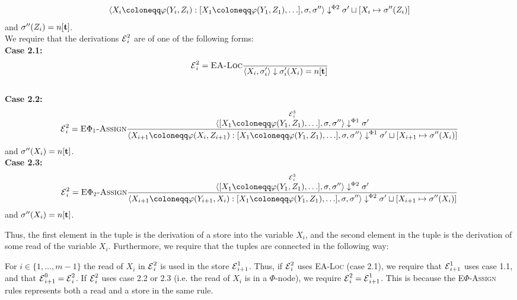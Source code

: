 \begin{definition}
\begin{align*}
        {\bigsteppr{\phistore{X_i}{Y_i}{Z_i} : \defaultphilist}{\store}{\store''}{\storeassign{\store'}{X_i \mapsto \store''(Z_i)}}}\\
    \end{align*} and $\store''(Z_i) = \tracked{}$.\\
    We require that the derivations $\operatorname{\mathcal{E}}^2_i$ are of one of the following forms:\\
    \textbf{Case 2.1:}\\
    \begin{align*}
        \E^2_i=\bsrule{EA-Loc}{}
        {\bigstep{X_i}{\store_i'}{\store_i'(X_i) = \tracked{}}}
    \end{align*}\\
    \textbf{Case 2.2:}\\
    \begin{align*}
        \E^2_i=\bsrule{E$\Phi_1$-Assign}
        {\overset{\E^3_i}{\bigsteppl{\defaultphilist}{\store}{\store''}{\store'}}}
        {\bigsteppl{\phistore{X_{i+1}}{X_i}{Z_{i+1}} : \defaultphilist}{\store}{\store''}{\storeassign{\store'}{X_{i+1} \mapsto \store''(X_i)}}}\\
    \end{align*} and $\store''(X_i) = \tracked{}$.\\
    \textbf{Case 2.3:}\\
    \begin{align*}
        \E^2_i=\bsrule{E$\Phi_2$-Assign}
        {\overset{\E^3_i}{\bigsteppr{\defaultphilist}{\store}{\store''}{\store'}}}
        {\bigsteppr{\phistore{X_{i+1}}{Y_{i+1}}{X_i} : \defaultphilist}{\store}{\store''}{\storeassign{\store'}{X_{i+1} \mapsto \store''(X_i)}}}\\
    \end{align*} and $\store''(X_i) = \tracked{}$.

    Thus, the first element in the tuple is the derivation of a store into the variable
    $X_i$, and the second element in the tuple is the derivation of some read of the 
    variable $X_i$.
    Furthermore, we require that the tuples are connected in the following way:
    
    For $i \in \{1, \ldots, m-1\}$ the read of $X_i$ in $\operatorname{\mathcal{E}}^2_i$ is used in the store
    $\operatorname{\mathcal{E}}^1_{i+1}$.
    Thus, if $\operatorname{\mathcal{E}}^2_i$ uses \textsc{EA-Loc} (case 2.1), we require that $\operatorname{\mathcal{E}}^1_{i+1}$ uses case 1.1,
    and that $\operatorname{\mathcal{E}}^0_{i+1} = \operatorname{\mathcal{E}}^2_i$.
    If $\operatorname{\mathcal{E}}^2_i$ uses case 2.2 or 2.3 (i.e. the read of $X_i$ is in a $\Phi$-node), we require
    $\operatorname{\mathcal{E}}^2_i = \operatorname{\mathcal{E}}^1_{i+1}$.
    This is because the \textsc{E$\Phi$-Assign} rules represents both a read and a store
    in the same rule.
\end{definition}

